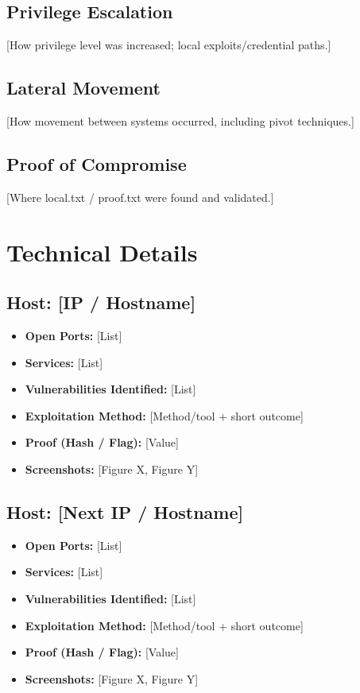 \documentclass[11pt]{article}
\begin{document}
\subsection{Privilege Escalation}
[How privilege level was increased; local exploits/credential paths.]

\subsection{Lateral Movement}
[How movement between systems occurred, including pivot techniques.]

\subsection{Proof of Compromise}
[Where local.txt / proof.txt were found and validated.]

\section{Technical Details}

\subsection*{Host: [IP / Hostname]}
\begin{itemize}
  \item \textbf{Open Ports:} [List]
  \item \textbf{Services:} [List]
  \item \textbf{Vulnerabilities Identified:} [List]
  \item \textbf{Exploitation Method:} [Method/tool + short outcome]
  \item \textbf{Proof (Hash / Flag):} [Value]
  \item \textbf{Screenshots:} [Figure X, Figure Y]
\end{itemize}

\subsection*{Host: [Next IP / Hostname]}
\begin{itemize}
  \item \textbf{Open Ports:} [List]
  \item \textbf{Services:} [List]
  \item \textbf{Vulnerabilities Identified:} [List]
  \item \textbf{Exploitation Method:} [Method/tool + short outcome]
  \item \textbf{Proof (Hash / Flag):} [Value]
  \item \textbf{Screenshots:} [Figure X, Figure Y]
\end{itemize}
\end{document}
